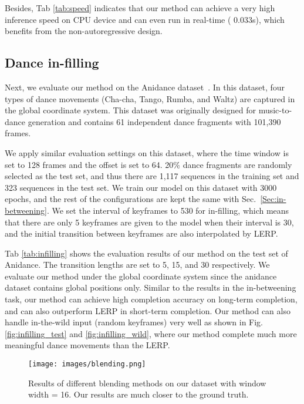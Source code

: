 \documentclass[10pt,twocolumn,letterpaper]{article}
\begin{document}
Besides, Tab \ref{tab:speed} indicates that our method can achieve a very high inference speed on CPU device and can even run in real-time ( 0.033s), which benefits from the non-autoregressive design.


\subsection{Dance in-filling}

Next, we evaluate our method on the Anidance dataset~\cite{tang2018anidance}. In this dataset, four types of dance movements (Cha-cha, Tango, Rumba, and Waltz) are captured in the global coordinate system. This dataset was originally designed for music-to-dance generation and contains 61 independent dance fragments with 101,390 frames.

We apply similar evaluation settings on this dataset, where the time window is set to 128 frames and the offset is set to 64. 20\% dance fragments are randomly selected as the test set, and thus there are 1,117 sequences in the training set and 323 sequences in the test set. We train our model on this dataset with 3000 epochs, and the rest of the configurations are kept the same with Sec.~\ref{Sec:in-betweening}. We set the interval of keyframes to 530 for in-filling, which means that there are only 5 keyframes are given to the model when their interval is 30, and the initial transition between keyframes are also interpolated by LERP. 

Tab \ref{tab:infilling} shows the evaluation results of our method on the test set of Anidance. The transition lengths are set to 5, 15, and 30 respectively. We evaluate our method under the global coordinate system since the anidance dataset contains global positions only. Similar to the results in the in-betweening task, our method can achieve high completion accuracy on long-term completion, and can also outperform LERP in short-term completion. Our method can also handle in-the-wild input (random keyframes) very well as shown in Fig.\ref{fig:infilling_test} and \ref{fig:infilling_wild}, where our method complete much more meaningful dance movements than the LERP. 

\begin{figure}
  \centering
  \texttt{[image: images/blending.png]}
  \caption{Results of different blending methods on our dataset with window width = 16. Our results are much closer to the ground truth.}
  \label{fig:blending}
\end{figure}
\end{document}
